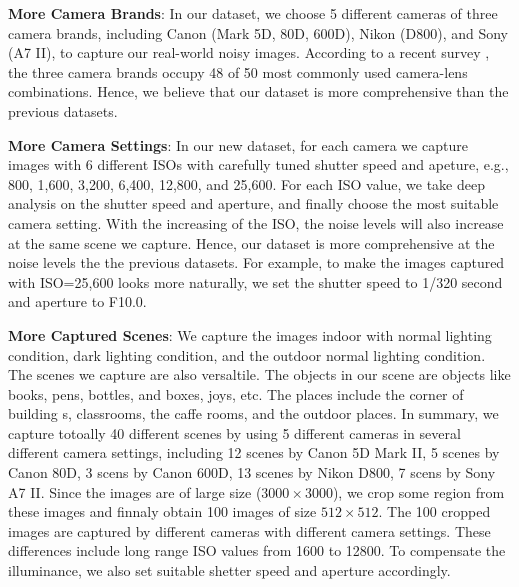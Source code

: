 \textbf{More Camera Brands}: In our dataset, we choose 5 different cameras of three camera brands, including Canon (Mark 5D, 80D, 600D), Nikon (D800), and Sony (A7 II), to capture our real-world noisy images. According to a recent survey \cite{commoncamera}, the three camera brands occupy 48 of 50 most commonly used camera-lens combinations. Hence, we believe that our dataset is more comprehensive than the previous datasets.


\textbf{More Camera Settings}: In our new dataset, for each camera we capture images with 6 different ISOs with carefully tuned shutter speed and apeture, e.g., 800, 1,600, 3,200, 6,400, 12,800, and 25,600. For each ISO value, we take deep analysis on the shutter speed and aperture, and finally choose the most suitable camera setting. With the increasing of the ISO, the noise levels will also increase at the same scene we capture. Hence, our dataset is more comprehensive at the noise levels the the previous datasets. For example, to make the images captured with ISO=25,600 looks more naturally, we set the shutter speed to 1/320 second and aperture to F10.0. 

\textbf{More Captured Scenes}: We capture the images indoor with normal lighting condition, dark lighting condition, and the outdoor normal lighting condition. The scenes we capture are also versaltile. The objects in our scene are objects like books, pens, bottles, and boxes, joys, etc. The places include the corner of building s, classrooms, the caffe rooms, and the outdoor places. In summary, we capture totoally 40 different scenes by using 5 different cameras in several different camera settings, including 12 scenes by Canon 5D Mark II, 5 scenes by Canon 80D, 3 scens by Canon 600D, 13 scenes by Nikon D800, 7 scens by Sony A7 II. Since the images are of large size ($3000\times3000$), we crop some region from these images and finnaly obtain 100 images of size $512\times512$. The 100 cropped images are captured by different cameras with different camera settings. These differences include long range ISO values from 1600 to 12800. To compensate the illuminance, we also set suitable shetter speed and aperture accordingly. 

